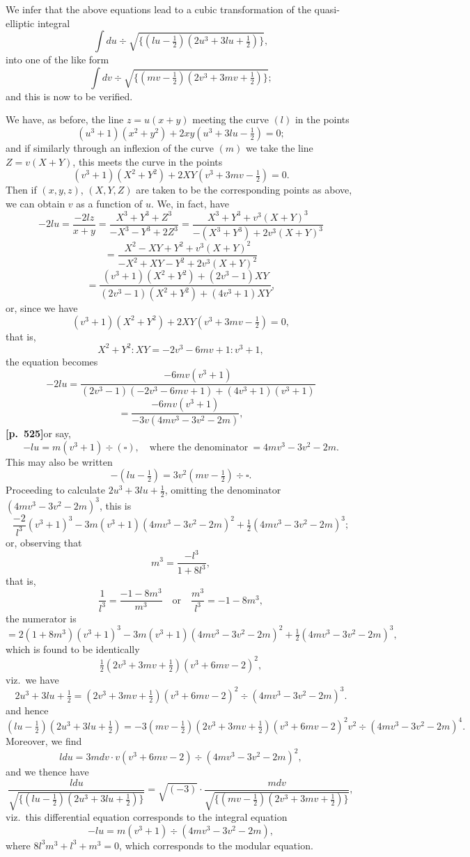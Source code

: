 \documentclass[11pt,a4paper]{article}
\begin{document}
We infer that the above equations lead to a cubic transformation of the quasi-elliptic integral
\[
\int du \div \sqrt{\{(lu - \tfrac{1}{2})(2u^{3} + 3lu + \tfrac{1}{2})\}},
\]
into one of the like form
\[
\int dv \div \sqrt{\{(mv - \tfrac{1}{2})(2v^{3} + 3mv + \tfrac{1}{2})\}};
\]
and this is now to be verified.

We have, as before, the line $z = u(x + y)$ meeting the curve $(l)$ in the points
\[
(u^{3} + 1)(x^{2} + y^{2}) + 2xy(u^{3} + 3lu - \tfrac{1}{2}) = 0;
\]
and if similarly through an inflexion of the curve $(m)$ we take the line $Z = v(X + Y)$, this meets the curve in the points
\[
(v^{3} + 1)(X^{2} + Y^{2}) + 2XY(v^{3} + 3mv - \tfrac{1}{2}) = 0.
\]
Then if $(x, y, z)$, $(X, Y, Z)$ are taken to be the corresponding points as above, we can obtain $v$ as a function of $u$. We, in fact, have
\[
-2lu = \frac{-2lz}{x + y} = \frac{X^{3} + Y^{3} + Z^{3}}{-X^{3} - Y^{3} + 2Z^{3}} = \frac{X^{3} + Y^{3} + v^{3}(X + Y)^{3}}{-(X^{3} + Y^{3}) + 2v^{3}(X + Y)^{3}}
\]
\[
= \frac{X^{2} - XY + Y^{2} + v^{3}(X + Y)^{2}}{-X^{2} + XY - Y^{2} + 2v^{3}(X + Y)^{2}}
\]
\[
= \frac{(v^{3} + 1)(X^{2} + Y^{2}) + (2v^{3} - 1)XY}{(2v^{3} - 1)(X^{2} + Y^{2}) + (4v^{3} + 1)XY},
\]
or, since we have
\[
(v^{3} + 1)(X^{2} + Y^{2}) + 2XY(v^{3} + 3mv - \tfrac{1}{2}) = 0,
\]
that is,
\[
X^{2} + Y^{2} : XY = -2v^{3} - 6mv + 1 : v^{3} + 1,
\]
the equation becomes
\[
-2lu = \frac{-6mv(v^{3} + 1)}{(2v^{3} - 1)(-2v^{3} - 6mv + 1) + (4v^{3} + 1)(v^{3} + 1)}
\]
\[
= \frac{-6mv(v^{3} + 1)}{-3v(4mv^{3} - 3v^{2} - 2m)},
\]
\noindent\textbf{[p.~525]}\quad or say,
\[
-lu = m(v^{3} + 1) \div (\square),\quad \text{where the denominator}\ = 4mv^{3} - 3v^{2} - 2m.
\]
This may also be written
\[
-(lu - \tfrac{1}{2}) = 3v^{2}(mv - \tfrac{1}{2}) \div \square.
\]
Proceeding to calculate $2u^{3} + 3lu + \tfrac{1}{2}$, omitting the denominator $(4mv^{3} - 3v^{2} - 2m)^{3}$, this is
\[
\frac{-2}{l^{3}}(v^{3} + 1)^{3} - 3m(v^{3} + 1)(4mv^{3} - 3v^{2} - 2m)^{2} + \tfrac{1}{2}(4mv^{3} - 3v^{2} - 2m)^{3};
\]
or, observing that
\[
m^{3} = \frac{-l^{3}}{1 + 8l^{3}},
\]
that is,
\[
\frac{1}{l^{3}} = \frac{-1 - 8m^{3}}{m^{3}}\quad \text{or}\quad \frac{m^{3}}{l^{3}} = -1 - 8m^{3},
\]
the numerator is
\[
= 2(1 + 8m^{3})(v^{3} + 1)^{3} - 3m(v^{3} + 1)(4mv^{3} - 3v^{2} - 2m)^{2} + \tfrac{1}{2}(4mv^{3} - 3v^{2} - 2m)^{3},
\]
which is found to be identically
\[
\tfrac{1}{2}(2v^{3} + 3mv + \tfrac{1}{2})(v^{3} + 6mv - 2)^{2},
\]
viz.\ we have
\[
2u^{3} + 3lu + \tfrac{1}{2} = (2v^{3} + 3mv + \tfrac{1}{2})(v^{3} + 6mv - 2)^{2} \div (4mv^{3} - 3v^{2} - 2m)^{3}.
\]
and hence
\[
(lu - \tfrac{1}{2})(2u^{3} + 3lu + \tfrac{1}{2}) = -3(mv - \tfrac{1}{2})(2v^{3} + 3mv + \tfrac{1}{2})(v^{3} + 6mv - 2)^{2}v^{2} \div (4mv^{3} - 3v^{2} - 2m)^{4}.
\]
Moreover, we find
\[
ldu = 3mdv \cdot v(v^{3} + 6mv - 2) \div (4mv^{3} - 3v^{2} - 2m)^{2},
\]
and we thence have
\[
\frac{ldu}{\sqrt{\{(lu - \tfrac{1}{2})(2u^{3} + 3lu + \tfrac{1}{2})\}}} = \sqrt{(-3)} \cdot \frac{mdv}{\sqrt{\{(mv - \tfrac{1}{2})(2v^{3} + 3mv + \tfrac{1}{2})\}}},
\]
viz.\ this differential equation corresponds to the integral equation
\[
-lu = m(v^{3} + 1) \div (4mv^{3} - 3v^{2} - 2m),
\]
where $8l^{3}m^{3} + l^{3} + m^{3} = 0$, which corresponds to the modular equation.
\end{document}
